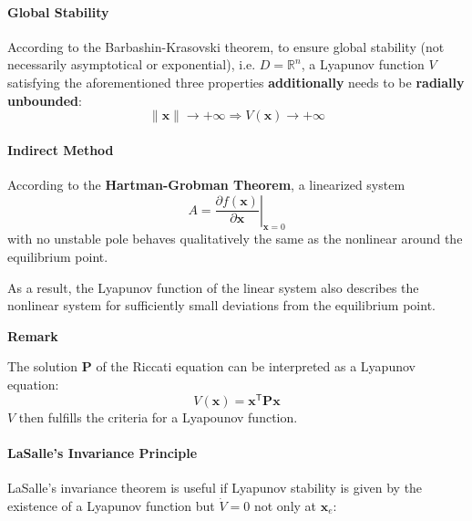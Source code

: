 \paragraph{Global Stability}
According to the Barbashin-Krasovski theorem, to ensure global stability (not necessarily asymptotical or exponential), i.e. $D=\mathbb{R}^n$, a Lyapunov function $V$ satisfying the aforementioned three properties \textbf{additionally} needs to be \textbf{radially unbounded}:
\noindent\begin{equation*}
    \|\mathbf{x}\| \to +\infty \Rightarrow V(\mathbf{x}) \to +\infty
\end{equation*}

\paragraph{Indirect Method}
According to the \textbf{Hartman-Grobman Theorem}, a linearized system
\noindent\begin{equation*}
    A = \left.\frac{\partial f(\mathbf{x})}{\partial \mathbf{x}} \right|_{\mathbf{x} = 0}
\end{equation*} with no unstable pole behaves qualitatively the same as the nonlinear around the equilibrium point.

\newpar{}
As a result, the Lyapunov function of the linear system also describes the nonlinear system for sufficiently small deviations from the equilibrium point.

\newpar{}
\textbf{Remark}

The solution $\mathbf{P}$ of the Riccati equation can be interpreted as a Lyapunov equation:
\noindent\begin{equation*}
    V(\mathbf{x}) = \mathbf{x}^{\mathsf{T}} \mathbf{Px}
\end{equation*}
$V$ then fulfills the criteria for a Lyapounov function.

\paragraph{LaSalle's Invariance Principle}
LaSalle's invariance theorem is useful if Lyapunov stability is given by the existence of a Lyapunov function but $\dot{V}=0$ not only at $\mathbf{x}_e$:

